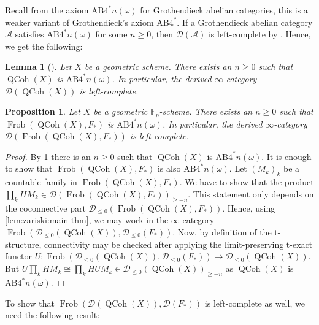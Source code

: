 \documentclass{article}
\theoremstyle{definition}
\theoremstyle{definition}
\theoremstyle{definition}
\theoremstyle{plain}
\newtheorem{lem}[defn]{Lemma}
\theoremstyle{plain}
\theoremstyle{plain}
\theoremstyle{plain}
\theoremstyle{plain}
\theoremstyle{plain}
\newtheorem{prop}[defn]{Proposition}
\theoremstyle{plain}
\theoremstyle{plain}
\theoremstyle{remark}
\theoremstyle{remark}
\theoremstyle{plain}
\theoremstyle{plain}
\theoremstyle{plain}
\theoremstyle{plain}
\theoremstyle{plain}
\newcommand{\Fp}{\mathbb{F}_p}
\newcommand{\QCoh}[1]{\operatorname{QCoh}(#1)}
\newcommand{\Frob}[2]{\operatorname{Frob}(#1, #2)}
\newcommand{\Cat}[1]{\mathcal{#1}}
\begin{document}
Recall from \cite[Definition 8.3 (d)]{antieau2018uniqueness} the axiom $\mathrm{AB}4^*n(\omega)$ 
for Grothendieck abelian categories, this is a weaker variant of Grothendieck's axiom $\mathrm{AB}4^*$.
If a Grothendieck abelian category $\Cat A$ satisfies $\mathrm{AB}4^*n(\omega)$ 
for some $n \ge 0$, then $\Cat D(\Cat A)$ is left-complete by 
\cite[Proposition 8.14]{antieau2018uniqueness}. Hence, we get the following:

\begin{lem} [{\cite[Theorem 1.4]{positselski2025roosaxiomholdsquasicoherent}}] \label{lem:ab4:qcoh-is-ab4n} 
    Let $X$ be a geometric scheme.
    There exists an $n \ge 0$ such that $\QCoh{X}$ is $\mathrm{AB}4^*n(\omega)$.
    In particular, the derived $\infty$-category $\Cat D(\QCoh{X})$ is left-complete.
\end{lem}

\begin{prop} \label{lem:ab4:frob-qcoh-is-ab4n}
    Let $X$ be a geometric $\Fp$-scheme.
    There exists an $n \ge 0$ such that $\Frob{\QCoh{X}}{F_*}$ is $\mathrm{AB}4^*n(\omega)$.
    In particular, the derived $\infty$-category $\Cat D(\Frob{\QCoh{X}}{F_*})$ is left-complete.
\end{prop}
\begin{proof}
    By \cref{lem:ab4:qcoh-is-ab4n} there is an $n \ge 0$ such that $\QCoh{X}$ is $\mathrm{AB}4^*n(\omega)$.
    It is enough to show that $\Frob{\QCoh{X}}{F_*}$ is also $\mathrm{AB}4^*n(\omega)$.
    Let $(M_k)_k$ be a countable family in $\Frob{\QCoh{X}}{F_*}$.
    We have to show that the product $\prod_k HM_k \in \Cat D(\Frob{\QCoh{X}}{F_*})_{\ge -n}$.
    This statement only depends on the coconnective part $\Cat D_{\le 0}(\Frob{\QCoh{X}}{F_*})$.
    Hence, using \cref{lem:zariski:main-thm}, we may work in the $\infty$-category $\Frob{\Cat D_{\le 0}(\QCoh{X})}{\Cat D_{\le 0}(F_*)}$.
    Now, by definition of the t-structure, connectivity 
    may be checked after applying the limit-preserving t-exact functor $U \colon \Frob{\Cat D_{\le 0}(\QCoh{X})}{\Cat D_{\le 0}(F_*)} \to \Cat D_{\le 0}(\QCoh{X})$.
    But $U \prod_k HM_k \cong \prod_k HUM_k \in \Cat D_{\le 0}(\QCoh{X})_{\ge -n}$
    as $\QCoh{X}$ is $\mathrm{AB}4^*n(\omega)$.
\end{proof}

To show that $\Frob{\Cat D(\QCoh{X})}{\Cat D(F_*)}$ is left-complete as well,
we need the following result:
\end{document}
